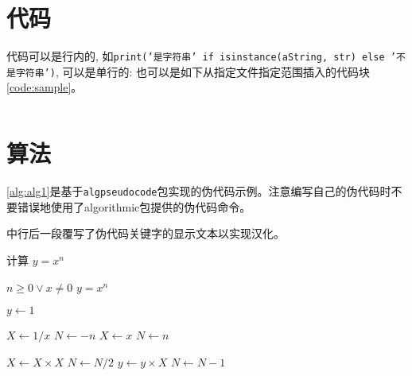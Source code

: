 \begin{figure}
    
    \label{fig:near_field}
\end{figure}

\section{代码}

代码可以是行内的, 如\texttt{print('是字符串' if isinstance(aString, str) else '不是字符串')}, 可以是单行的:
也可以是如下从指定文件指定范围插入的代码块\autoref{code:sample}。
\begin{listing}[H]
    \inputminted[firstline=26, lastline=37]{c}{assets/example.c}
    \label{code:sample}
\end{listing}

\section{算法}

\autoref{alg:alg1}是基于\texttt{algpseudocode}包实现的伪代码示例。注意编写自己的伪代码时不要错误地使用了algorithmic包提供的伪代码命令。

中\texttt{\RequirePackage{algpseudocode}}行后一段覆写了伪代码关键字的显示文本以实现汉化。

\begin{algorithm}
    \caption{计算 $y = x^n$}\label{alg:alg1}
    \begin{algorithmic}[1]  %
        \Require $n \geq 0 \vee x \neq 0$
        \Ensure $y = x^n$

        \State $y \gets 1$

            \State $X \gets 1 / x$
            \State $N \gets -n$
        \Else
            \State $X \gets x$
            \State $N \gets n$
        \EndIf

                \State $X \gets X \times X$
                \State $N \gets N / 2$
                \State $y \gets y \times X$
                \State $N \gets N - 1$
            \EndIf
        \EndWhile
    \end{algorithmic}
\end{algorithm}